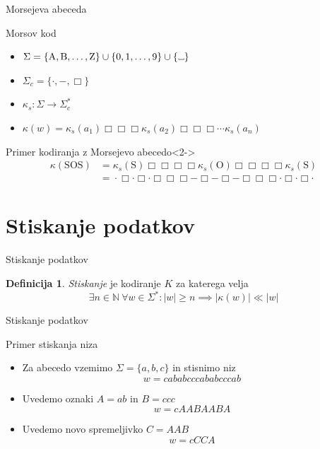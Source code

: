 \documentclass{beamer}
\newcommand{\N}{\mathbb{N}}
\theoremstyle{definition} %
\newtheorem{definicija}{Definicija}[section]
\newcommand\Vtextvisiblespace[1][.3em]{%
\mbox{\kern.06em\vrule height.3ex}%
\vbox{\hrule width#1}%
\hbox{\vrule height.3ex}}
\begin{document}
\begin{frame}{Morsejeva abeceda}
    \begin{block}{Morsov kod}
        \begin{itemize}
            \item  $ \Sigma = \{ \text{A},  \text{B}, \ldots, \text{Z} \} \cup \{ 0, 1, \ldots, 9 \}
            \cup \{ \Vtextvisiblespace[5pt] \} $
            \item $ \Sigma_c = \{ \cdot ,-, \Box \} $
            \item $ \kappa_s \colon \Sigma \to \Sigma_c^* $
            \item $ \kappa(w) = \kappa_s(a_1) \Box\Box\Box  \kappa_s(a_2) \Box\Box\Box \cdots \kappa_s(a_n) $
        \end{itemize}
    \end{block}
    \begin{exampleblock}{Primer kodiranja z Morsejevo abecedo}<2->
        \[
        \begin{split}
            \kappa(\text{SOS}) & = \kappa_s(\text{S}) \Box\Box\Box\Box \kappa_s(\text{O}) \Box\Box\Box\Box \kappa_s(\text{S})\\
            & = \phantom{} \cdot\Box\cdot\Box\cdot \Box\Box\Box -\Box-\Box- \Box\Box\Box \cdot\Box\cdot\Box\cdot \phantom{}  
        \end{split}
        \]
    \end{exampleblock}
\end{frame}

\section*{Stiskanje podatkov}

\begin{frame}{Stiskanje podatkov}    
    \begin{definicija}
        \textit{Stiskanje} je kodiranje $ K $ za katerega velja 
        \[ 
        \exists n \in \N \ \forall w \in \Sigma^* \colon |w| \geq n \implies
        \left\lvert \kappa(w)\right\rvert \ll \left\lvert w \right\rvert
        \]
    \end{definicija}
\end{frame}

\begin{frame}{Stiskanje podatkov}
    \begin{exampleblock}{Primer stiskanja niza}
        \begin{itemize}
            \item Za abecedo vzemimo $ \Sigma = \{ a,b,c \} $ in stisnimo niz
            \[
                w = \mathit{cababcccababcccab}
            \]
            \item<2-> Uvedemo oznaki $ A = \mathit{ab} $ in $ B = \mathit{ccc} $ 
            \[
                w = \mathit{cAABAABA}
            \]
            \item<3-> Uvedemo novo spremeljivko $ C = \mathit{AAB} $
            \[
                w = \mathit{cCCA}
            \]    
        \end{itemize}
    \end{exampleblock}
\end{frame}
\end{document}
